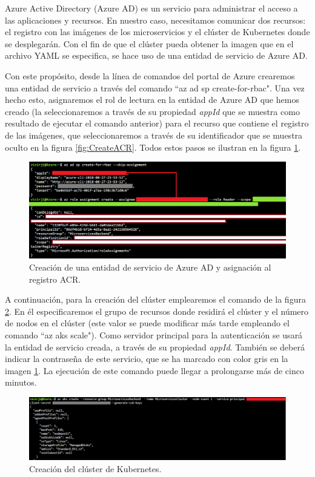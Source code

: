 \documentclass[11pt,spanish,listoffigures]{tfgetsinf}
\begin{document}
Azure Active Directory (Azure AD) es un servicio para administrar el acceso a las aplicaciones y recursos. En nuestro caso, necesitamos comunicar dos recursos: el registro con las imágenes de los microservicios y el clúster de Kubernetes donde se desplegarán. Con el fin de que el clúster pueda obtener la imagen que en el archivo YAML se especifica, se hace uso de una entidad de servicio de Azure AD.

Con este propósito, desde la línea de comandos del portal de Azure crearemos una entidad de servicio a través del comando ``az ad sp create-for-rbac". Una vez hecho esto, asignaremos el rol de lectura en la entidad de Azure AD que hemos creado (la seleccionaremos a través de su propiedad \textit{appId} que se muestra como resultado de ejecutar el comando anterior) para el recurso que contiene el registro de las imágenes, que seleccionaremos a través de su identificador que se muestra oculto en la figura \ref{fig:CreateACR}. Todos estos pasos se ilustran en la figura \ref{fig:ActiveDirectory}.

\begin{figure}[h]
\centering
\includegraphics[scale=0.5]{ActiveDirectory}
\caption{Creación de una entidad de servicio de Azure AD y asignación al registro ACR.}
\label{fig:ActiveDirectory}
\end{figure}

A continuación, para la creación del clúster emplearemos el comando de la figura \ref{fig:CreateCluster}. En él especificaremos el grupo de recursos donde residirá el clúster y el número de nodos en el clúster (este valor se puede modificar más tarde empleando el comando ``az aks scale"). Como servidor principal para la autenticación se usará la entidad de servicio creada, a través de su propiedad \textit{appId}. También se deberá indicar la contraseña de este servicio, que se ha marcado con color gris en la imagen \ref{fig:ActiveDirectory}. La ejecución de este comando puede llegar a prolongarse más de cinco minutos.

\begin{figure}[h]
\centering
\includegraphics[scale=0.5]{CreateCluster}
\caption{Creación del clúster de Kubernetes.}
\label{fig:CreateCluster}
\end{figure}
\end{document}
